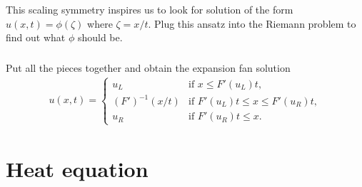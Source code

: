 \documentclass[11pt,letterpaper]{report}
\begin{document}
\subsection{}
This scaling symmetry inspires us to look for solution of the form $u(x,t) = \phi(\zeta)$ where $\zeta = x/t$. Plug this ansatz into the Riemann problem to find out what $\phi$ should be.

\subsection{}
Put all the pieces together and obtain the expansion fan solution
\begin{align}
    u(x,t) = \begin{cases}
        u_L &\text{if } x \leq F'(u_L) t, \\
        (F')^{-1}(x/t) &\text{if } F'(u_L) t \leq x \leq F'(u_R) t, \\
        u_R &\text{if } F'(u_R) t \leq x.
    \end{cases}
\end{align}

\chapter{Heat equation}


\newpage
\printbibliography
\end{document}
